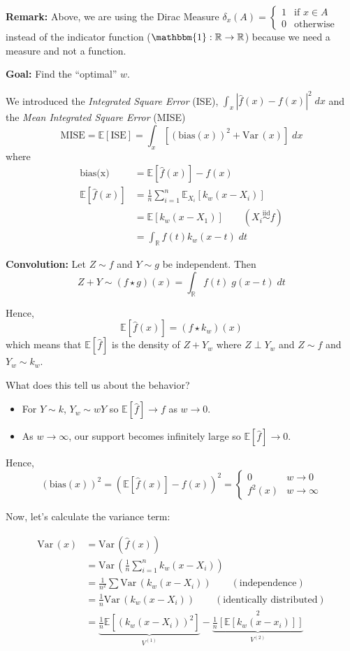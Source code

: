 \documentclass[12pt]{report}
\renewcommand{\hat}[1]{\widehat{#1}}
\newcommand{\R}{\mathbb{R}}
\newcommand{\E}{\mathbb{E}}
\newcommand{\ind}{\mathbbm{1}}
\newcommand{\abs}[1]{\left\vert #1 \right\vert}
\newcommand{\Var}{\text{Var}\,}
\newcommand{\iid}{\overset{\text{iid}}{\sim}}
\newcommand*{\tbf}[1]{\ifmmode\mathbf{#1}\else\textbf{#1}\fi}
\begin{document}
\tbf{Remark:} Above, we are using the Dirac Measure $\delta_x(A) = \begin{cases}
		1 & \text{if } x \in A \\
		0 & \text{otherwise}
	\end{cases}$ instead of the indicator function ($\ind: \R \to \R$) because we need a measure and not a function.

\tbf{Goal:} Find the ``optimal'' $w$.

We introduced the \emph{Integrated Square Error} (ISE), $\int_x \abs{\hat f(x) - f(x)}^2\; dx$ and the \emph{Mean Integrated Square Error} (MISE)
\[\text{MISE} = \E[\text{ISE}]= \int_x [(\text{bias}(x))^2 + \Var(x)]\; dx\]
where
\begin{align*}
	\text{bias(x)} & = \E[\hat f(x)] - f(x)                            \\
	\E[\hat f(x)]  & = \frac{1}{n} \sum_{i=1}^n \E_{X_i}[k_w(x - X_i)] \\
	               & = \E[k_w(x - X_1)] \qquad (X_i \iid f)            \\
	               & = \int_{\R} f(t) k_w(x - t)\; dt
\end{align*}

\tbf{Convolution:} Let $Z \sim f$ and $Y \sim g$ be independent. Then
\[Z + Y \sim (f \star g)(x) = \int_{\R} f(t)\; g(x - t)\; dt\]

Hence,
\[\E[\hat f(x)] = (f \star k_w)(x)\]
which means that $\E[\hat f]$ is the density of $Z + Y_w$ where $Z \perp Y_w$ and $Z \sim f$ and $Y_w \sim k_w$.

What does this tell us about the behavior?
\begin{itemize}
	\item For $Y \sim k$, $Y_w \sim wY$ so $\E[\hat f] \to f$ as $w \to 0$.
	\item As $w \to \infty$, our support becomes infinitely large so $\E[\hat f] \to 0$.
\end{itemize}

Hence,
\[(\text{bias}(x))^2 = (\E[\hat f(x)] - f(x))^2 = \begin{cases}
		0      & w\to 0      \\
		f^2(x) & w\to \infty
	\end{cases}\]

Now, let's calculate the variance term:

\begin{align*}
	\Var(x) & = \Var(\hat f(x))                                                                                              \\
	        & = \Var\left(\frac{1}{n} \sum_{i=1}^n k_w(x - X_i)\right)                                                       \\
	        & = \frac{1}{n^2} \sum \Var(k_w(x- X_i)) \qquad (\text{independence})                                            \\
	        & = \frac{1}{n}\Var(k_w(x - X_i)) \qquad (\text{identically distributed})                                        \\
	        & = \underbrace{\frac{1}{n}\E[(k_w(x- X_i))^2]}_{V^{(1)}} - \underbrace{\frac{1}{n}[\E[k_w(x-x_i)]]}_{V^{(2)}}^2
\end{align*}
\end{document}
